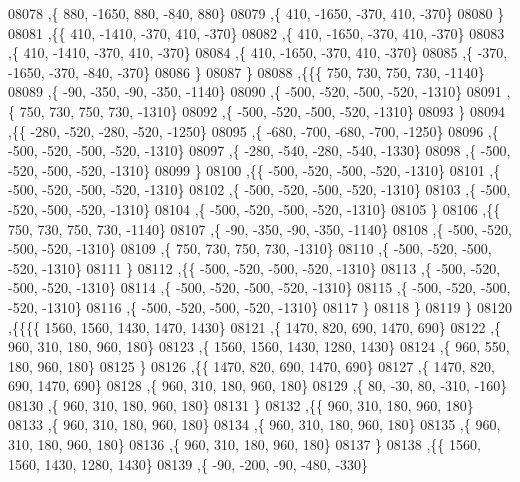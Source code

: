 \begin{DoxyCode}
08078     ,\{   880, -1650,   880,  -840,   880\}
08079     ,\{   410, -1650,  -370,   410,  -370\}
08080     \}
08081    ,\{\{   410, -1410,  -370,   410,  -370\}
08082     ,\{   410, -1650,  -370,   410,  -370\}
08083     ,\{   410, -1410,  -370,   410,  -370\}
08084     ,\{   410, -1650,  -370,   410,  -370\}
08085     ,\{  -370, -1650,  -370,  -840,  -370\}
08086     \}
08087    \}
08088   ,\{\{\{   750,   730,   750,   730, -1140\}
08089     ,\{   -90,  -350,   -90,  -350, -1140\}
08090     ,\{  -500,  -520,  -500,  -520, -1310\}
08091     ,\{   750,   730,   750,   730, -1310\}
08092     ,\{  -500,  -520,  -500,  -520, -1310\}
08093     \}
08094    ,\{\{  -280,  -520,  -280,  -520, -1250\}
08095     ,\{  -680,  -700,  -680,  -700, -1250\}
08096     ,\{  -500,  -520,  -500,  -520, -1310\}
08097     ,\{  -280,  -540,  -280,  -540, -1330\}
08098     ,\{  -500,  -520,  -500,  -520, -1310\}
08099     \}
08100    ,\{\{  -500,  -520,  -500,  -520, -1310\}
08101     ,\{  -500,  -520,  -500,  -520, -1310\}
08102     ,\{  -500,  -520,  -500,  -520, -1310\}
08103     ,\{  -500,  -520,  -500,  -520, -1310\}
08104     ,\{  -500,  -520,  -500,  -520, -1310\}
08105     \}
08106    ,\{\{   750,   730,   750,   730, -1140\}
08107     ,\{   -90,  -350,   -90,  -350, -1140\}
08108     ,\{  -500,  -520,  -500,  -520, -1310\}
08109     ,\{   750,   730,   750,   730, -1310\}
08110     ,\{  -500,  -520,  -500,  -520, -1310\}
08111     \}
08112    ,\{\{  -500,  -520,  -500,  -520, -1310\}
08113     ,\{  -500,  -520,  -500,  -520, -1310\}
08114     ,\{  -500,  -520,  -500,  -520, -1310\}
08115     ,\{  -500,  -520,  -500,  -520, -1310\}
08116     ,\{  -500,  -520,  -500,  -520, -1310\}
08117     \}
08118    \}
08119   \}
08120  ,\{\{\{\{  1560,  1560,  1430,  1470,  1430\}
08121     ,\{  1470,   820,   690,  1470,   690\}
08122     ,\{   960,   310,   180,   960,   180\}
08123     ,\{  1560,  1560,  1430,  1280,  1430\}
08124     ,\{   960,   550,   180,   960,   180\}
08125     \}
08126    ,\{\{  1470,   820,   690,  1470,   690\}
08127     ,\{  1470,   820,   690,  1470,   690\}
08128     ,\{   960,   310,   180,   960,   180\}
08129     ,\{    80,   -30,    80,  -310,  -160\}
08130     ,\{   960,   310,   180,   960,   180\}
08131     \}
08132    ,\{\{   960,   310,   180,   960,   180\}
08133     ,\{   960,   310,   180,   960,   180\}
08134     ,\{   960,   310,   180,   960,   180\}
08135     ,\{   960,   310,   180,   960,   180\}
08136     ,\{   960,   310,   180,   960,   180\}
08137     \}
08138    ,\{\{  1560,  1560,  1430,  1280,  1430\}
08139     ,\{   -90,  -200,   -90,  -480,  -330\}

\end{DoxyCode}
